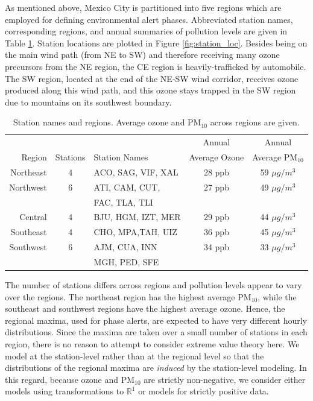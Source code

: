 \documentclass[alpha-refs]{wiley-article}
\begin{document}
As mentioned above, Mexico City is partitioned into five regions which are employed for defining environmental alert phases. Abbreviated station names, corresponding regions, and annual summaries of pollution levels are given in Table \ref{tab:stat}. Station locations are plotted in Figure \ref{fig:station_loc}.
Besides being on the main wind path (from NE to SW) and therefore receiving many ozone precursors from the NE region, the CE region is heavily-trafficked by automobile. The SW region, located at the end of the NE-SW wind corridor, receives ozone produced along this wind path, and this ozone stays trapped in the SW region due to mountains on its southwest boundary.
 \vspace{-3mm}
 \begin{table}[H]
\centering
\footnotesize
\begin{tabular}{rclcc}
  \hline
   &  &  & Annual & Annual \\
Region & Stations & Station Names &  Average Ozone & Average $\text{PM}_{10}$ \\
  \hline
Northeast & 4 & ACO, SAG, VIF, XAL & 28 ppb & 59 $\mu g / m^3$  \\
Northwest & 6 & ATI, CAM, CUT, & 27 ppb &49  $\mu g / m^3$  \\
 &  &  FAC, TLA, TLI &  &  \\
Central & 4 & BJU, HGM, IZT, MER & 29 ppb  &44 $\mu g / m^3$  \\
Southeast & 4 &  CHO, MPA,TAH, UIZ  & 36 ppb & 45 $\mu g / m^3$  \\
Southwest & 6 & AJM, CUA, INN & 34 ppb &33 $\mu g / m^3$  \\
 &  &  MGH, PED, SFE &  & \\
   \hline
\end{tabular}
\caption{Station names and regions. Average ozone and $\text{PM}_{10}$ across regions are given.}\label{tab:stat}
\end{table}
\vspace{-2mm}

The number of stations differs across regions and
pollution levels appear to vary over the regions. The northeast region has the highest average $\text{PM}_{10}$, while the southeast and southwest regions have the highest average ozone.   Hence, the regional maxima, used for phase alerts, are expected to have very different hourly distributions.  Since the maxima are taken over a small number of stations in each region, there is no reason to attempt to consider extreme value theory here.  We model at the station-level rather than at the regional level so that the distributions of the regional maxima are \emph{induced} by the station-level modeling.  In this regard, because ozone and $\text{PM}_{10}$ are strictly non-negative, we consider either models using transformations to $\mathbb{R}^{1}$ or models for strictly positive data.
\end{document}
